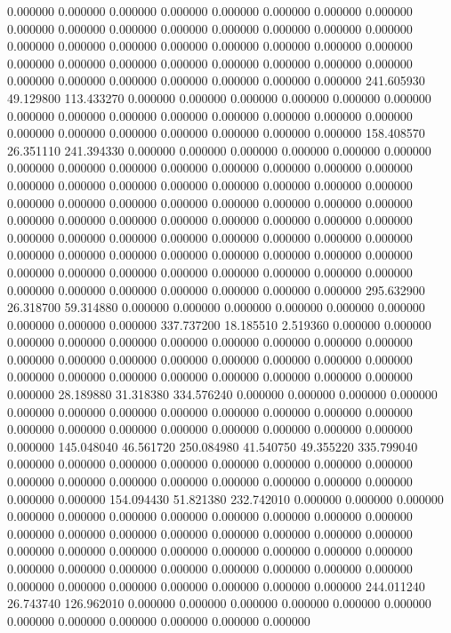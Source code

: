 0.000000 0.000000 0.000000
0.000000 0.000000 0.000000
0.000000 0.000000 0.000000
0.000000 0.000000 0.000000
0.000000 0.000000 0.000000
0.000000 0.000000 0.000000
0.000000 0.000000 0.000000
0.000000 0.000000 0.000000
0.000000 0.000000 0.000000
0.000000 0.000000 0.000000
0.000000 0.000000 0.000000
0.000000 0.000000 0.000000
0.000000 0.000000 0.000000
241.605930 49.129800 113.433270
0.000000 0.000000 0.000000
0.000000 0.000000 0.000000
0.000000 0.000000 0.000000
0.000000 0.000000 0.000000
0.000000 0.000000 0.000000
0.000000 0.000000 0.000000
0.000000 0.000000 0.000000
158.408570 26.351110 241.394330
0.000000 0.000000 0.000000
0.000000 0.000000 0.000000
0.000000 0.000000 0.000000
0.000000 0.000000 0.000000
0.000000 0.000000 0.000000
0.000000 0.000000 0.000000
0.000000 0.000000 0.000000
0.000000 0.000000 0.000000
0.000000 0.000000 0.000000
0.000000 0.000000 0.000000
0.000000 0.000000 0.000000
0.000000 0.000000 0.000000
0.000000 0.000000 0.000000
0.000000 0.000000 0.000000
0.000000 0.000000 0.000000
0.000000 0.000000 0.000000
0.000000 0.000000 0.000000
0.000000 0.000000 0.000000
0.000000 0.000000 0.000000
0.000000 0.000000 0.000000
0.000000 0.000000 0.000000
0.000000 0.000000 0.000000
0.000000 0.000000 0.000000
295.632900 26.318700 59.314880
0.000000 0.000000 0.000000
0.000000 0.000000 0.000000
0.000000 0.000000 0.000000
337.737200 18.185510 2.519360
0.000000 0.000000 0.000000
0.000000 0.000000 0.000000
0.000000 0.000000 0.000000
0.000000 0.000000 0.000000
0.000000 0.000000 0.000000
0.000000 0.000000 0.000000
0.000000 0.000000 0.000000
0.000000 0.000000 0.000000
0.000000 0.000000 0.000000
28.189880 31.318380 334.576240
0.000000 0.000000 0.000000
0.000000 0.000000 0.000000
0.000000 0.000000 0.000000
0.000000 0.000000 0.000000
0.000000 0.000000 0.000000
0.000000 0.000000 0.000000
0.000000 0.000000 0.000000
145.048040 46.561720 250.084980
41.540750 49.355220 335.799040
0.000000 0.000000 0.000000
0.000000 0.000000 0.000000
0.000000 0.000000 0.000000
0.000000 0.000000 0.000000
0.000000 0.000000 0.000000
0.000000 0.000000 0.000000
154.094430 51.821380 232.742010
0.000000 0.000000 0.000000
0.000000 0.000000 0.000000
0.000000 0.000000 0.000000
0.000000 0.000000 0.000000
0.000000 0.000000 0.000000
0.000000 0.000000 0.000000
0.000000 0.000000 0.000000
0.000000 0.000000 0.000000
0.000000 0.000000 0.000000
0.000000 0.000000 0.000000
0.000000 0.000000 0.000000
0.000000 0.000000 0.000000
0.000000 0.000000 0.000000
0.000000 0.000000 0.000000
244.011240 26.743740 126.962010
0.000000 0.000000 0.000000
0.000000 0.000000 0.000000
0.000000 0.000000 0.000000
0.000000 0.000000 0.000000
